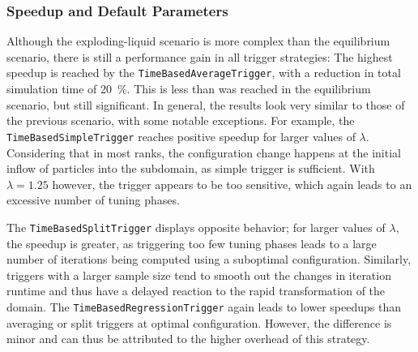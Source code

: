 \subsubsection{Speedup and Default Parameters}
Although the exploding-liquid scenario is more complex than the equilibrium scenario, there is still a performance gain in all trigger strategies: The highest speedup is reached by the \texttt{TimeBasedAverageTrigger}, with a reduction in total simulation time of \qty{20}{\percent}. This is less than was reached in the equilibrium scenario, but still significant.
In general, the results look very similar to those of the previous scenario, with some notable exceptions. For example, the \texttt{TimeBasedSimpleTrigger} reaches positive speedup for larger values of $\lambda$. Considering that in most ranks, the configuration change happens at the initial inflow of particles into the subdomain, as simple trigger is sufficient. With $\lambda=1.25$ however, the trigger appears to be too sensitive, which again leads to an excessive number of tuning phases.

The \texttt{TimeBasedSplitTrigger} displays opposite behavior; for larger values of $\lambda$, the speedup is greater, as triggering too few tuning phases leads to a large number of iterations being computed using a suboptimal configuration. Similarly, triggers with a larger sample size tend to smooth out the changes in iteration runtime and thus have a delayed reaction to the rapid transformation of the domain.
The \texttt{TimeBasedRegressionTrigger} again leads to lower speedups than averaging or split triggers at optimal configuration. However, the difference is minor and can thus be attributed to the higher overhead of this strategy.


